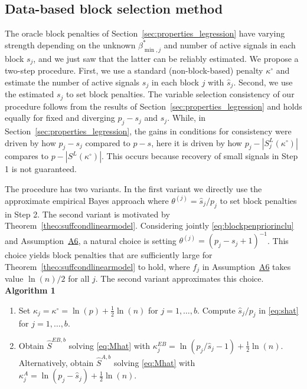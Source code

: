 \documentclass[bj,authoryear]{imsart}
\theoremstyle{plain}
\begin{document}
\subsection{Data-based block selection method} \label{ssec:databased_blockselection}

The oracle block penalties of Section~\ref{sec:properties_legression} have varying strength depending on the unknown $\beta^*_{\min,j}$ and number of active signals in each block $s_j$, and we just saw that the latter can be reliably estimated. We propose a two-step procedure. First, we use a standard (non-block-based) penalty $\kappa^{\circ}$ and estimate the number of active signals $s_j$ in each block $j$ with $\hat{s}_j$. Second, we use the estimated $s_j$ to set block penalties. The variable selection consistency of our procedure follows from the results of Section~\ref{sec:properties_legression} and holds equally for fixed and diverging $p_j-s_j$ and $s_j$. While, in Section~\ref{sec:properties_legression}, the gains in conditions for consistency were driven by how $p_j-s_j$ compared to $p-s$, here it is driven by how $p_j-|S^L_j (\kappa^{\circ})|$ compares to $p-|S^L (\kappa^{\circ})|$. This occurs because  recovery of small signals in Step 1 is not guaranteed.

The procedure has two variants. In the first variant we directly use the approximate empirical Bayes approach where $\theta^{(j)}= \hat{s}_j/p_j$ %
to set block penalties in Step 2. 
The second variant is motivated by Theorem~\ref{theo:suffcondlinearmodel}. Considering jointly \eqref{eq:blockpenpriorinclu} and Assumption~\hyperlink{lab:A6}{A6}, a natural choice is setting $\theta^{(j)}=(p_j-s_j+1)^{-1}$. This choice yields block penalties that are sufficiently large for Theorem~\ref{theo:suffcondlinearmodel} to hold, where $f_j$ in Assumption~\hyperlink{lab:A6}{A6} takes value $\ln(n)/2$ for all $j$. The second variant approximates this choice.\\

\textbf{Algorithm 1}
\begin{enumerate}[label=(\roman*)]
    \item Set $\kappa_j=\kappa^{\circ}=\ln(p)+\frac{1}{2}\ln(n)$ 
    for $j=1,\ldots,b$. Compute $\hat{s}_j/p_j$ in \eqref{eq:shat} for $j=1,\ldots,b$.

    \item Obtain $\hat{S}^{EB,b}$ solving \eqref{eq:Mhat} with $\kappa_j^{EB}= \ln(p_j/\hat{s}_j -1)+ \tfrac{1}{2}\ln(n)$.
    Alternatively, obtain $\hat{S}^{A,b}$ solving \eqref{eq:Mhat} with
    $\kappa_j^{A} = \ln(p_j-\hat{s}_j)+ \tfrac{1}{2}\ln(n)$.
\end{enumerate}
\end{document}
